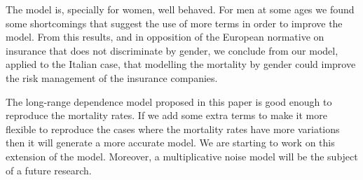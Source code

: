\documentclass[smallextended]{svjour3}
\begin{document}

        The model is, specially for women, well behaved. For men at some ages 
    we found some shortcomings that suggest the use of more terms in order to 
    improve the model. From this results, and in opposition of the European 
    normative on insurance  that does not discriminate by gender, we conclude 
    from our model, applied  to the Italian case, that modelling the mortality 
    by gender could improve  the risk management of the insurance companies.

        The long-range dependence model proposed in this paper is good
    enough to reproduce the mortality rates. If we add some extra terms to make 
    it more flexible to reproduce the cases where the mortality rates have more
    variations then it will generate a more accurate model. We are starting to 
    work on this extension of the model. Moreover, a multiplicative noise model 
    will be the subject of a future research.

    {}
\end{document}
